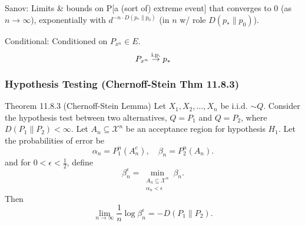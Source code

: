 Sanov: Limits \& bounds on P[a (sort of) extreme event] that converges to 0 (as $n\to\infty$), exponentially with $d^{-n\cdot D(p_\ast\| p_0)}$ (in $n$ w/ role $D(p_\ast\| p_0)$).

Conditional: Conditioned on $P_{x^n} \in E$. 
$$
P_{x^n} \stackrel{\text{i.p.}}{\to} p_\ast
$$

\newpage
\subsubsection{Hypothesis Testing (Chernoff-Stein Thm 11.8.3)}
\begin{shaded}
Theorem 11.8.3 (Chernoff-Stein Lemma) Let $X_1, X_2, \ldots, X_n$ be i.i.d. $\sim Q$. Consider the hypothesis test between two alternatives, $Q=P_1$ and $Q=P_2$, where $D\left(P_1 \| P_2\right)<\infty$. Let $A_n \subseteq \mathcal{X}^n$ be an acceptance region for hypothesis $H_1$. Let the probabilities of error be
$$
\alpha_n=P_1^n\left(A_n^c\right), \quad \beta_n=P_2^n\left(A_n\right) .
$$
and for $0<\epsilon<\frac{1}{2}$, define
$$
\beta_n^\epsilon=\min _{\substack{A_n \subseteq \mathcal{X}^n \\ \alpha_n<\epsilon}} \beta_n.
$$
Then
$$
\lim _{n \rightarrow \infty} \frac{1}{n} \log \beta_n^\epsilon=-D\left(P_1 \| P_2\right) .
$$
\end{shaded}


